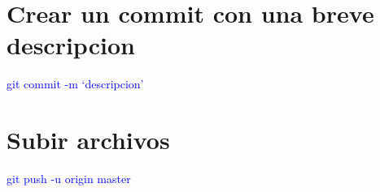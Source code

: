 \documentclass[spanish]{article}
\begin{document}
\section{Crear un commit con una breve descripcion}

\begin{center}
    \Large{\textcolor{blue}{ git commit -m `descripcion'}}
\end{center}

\section{Subir archivos}

\begin{center}
    \Large{\textcolor{blue}{ git push -u origin master}}
\end{center}
\end{document}
